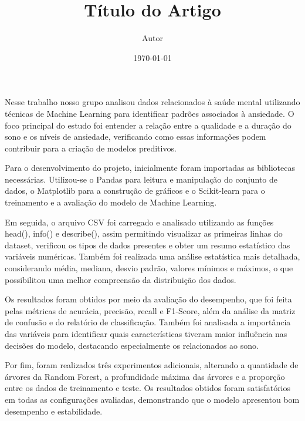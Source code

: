 \documentclass{article}
\title{Título do Artigo}
\author{Autor}
\date{\today}
\begin{document}
Nesse trabalho nosso grupo analisou dados relacionados à saúde mental utilizando técnicas de Machine Learning para identificar padrões associados à ansiedade. O foco principal do estudo foi entender a relação entre a qualidade e a duração do sono e os níveis de ansiedade, verificando como essas informações podem contribuir para a criação de modelos preditivos.

Para o desenvolvimento do projeto, inicialmente foram importadas as bibliotecas necessárias. Utilizou-se o Pandas para leitura e manipulação do conjunto de dados, o Matplotlib para a construção de gráficos e o Scikit-learn para o treinamento e a avaliação do modelo de Machine Learning.

Em seguida, o arquivo CSV foi carregado e analisado utilizando as funções head(), info() e describe(), assim permitindo visualizar as primeiras linhas do dataset, verificou os tipos de dados presentes e obter um resumo estatístico das variáveis numéricas. Também foi realizada uma análise estatística mais detalhada, considerando média, mediana, desvio padrão, valores mínimos e máximos, o que possibilitou uma melhor compreensão da distribuição dos dados.


Os resultados foram obtidos por meio da avaliação do desempenho, que  foi feita pelas métricas de acurácia, precisão, recall e F1-Score, além da análise da matriz de confusão e do relatório de classificação. Também foi analisada a importância das variáveis para identificar quais características tiveram maior influência nas decisões do modelo, destacando especialmente os relacionados ao sono.

Por fim, foram realizados três experimentos adicionais, alterando a quantidade de árvores da Random Forest, a profundidade máxima das árvores e a proporção entre os dados de treinamento e teste. Os resultados obtidos foram satisfatórios em todas as configurações avaliadas, demonstrando que o modelo apresentou bom desempenho e estabilidade.

\maketitle
\end{document}
